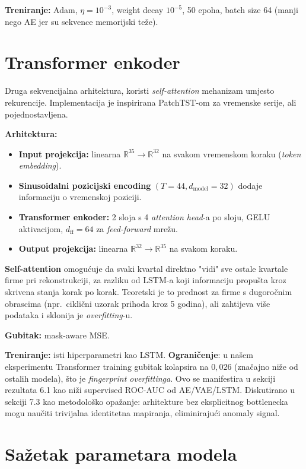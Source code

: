 \documentclass[diplomskirad,authoryear]{fer}
\begin{document}
\textbf{Treniranje:} Adam, $\eta = 10^{-3}$, weight decay $10^{-5}$, 50 epoha, batch size 64 (manji nego AE jer su sekvence memorijski teže).

\section{Transformer enkoder}

Druga sekvencijalna arhitektura, koristi \emph{self-attention} mehanizam \citep{vaswani2017} umjesto rekurencije. Implementacija je inspirirana PatchTST-om \citep{nie2023} za vremenske serije, ali pojednostavljena.

\textbf{Arhitektura:}
\begin{itemize}
 \item \textbf{Input projekcija:} linearna $\mathbb{R}^{35} \to \mathbb{R}^{32}$ na svakom vremenskom koraku (\emph{token embedding}).
 \item \textbf{Sinusoidalni pozicijski encoding} $(T=44, d_{\text{model}}=32)$ dodaje informaciju o vremenskoj poziciji.
 \item \textbf{Transformer enkoder:} 2 sloja s 4 \emph{attention head}-a po sloju, GELU aktivacijom, $d_{\text{ff}}=64$ za \emph{feed-forward} mrežu.
 \item \textbf{Output projekcija:} linearna $\mathbb{R}^{32} \to \mathbb{R}^{35}$ na svakom koraku.
\end{itemize}

\textbf{Self-attention} omogućuje da svaki kvartal direktno "vidi" sve ostale kvartale firme pri rekonstrukciji, za razliku od LSTM-a koji informaciju propušta kroz skrivena stanja korak po korak. Teoretski je to prednost za firme s dugoročnim obrascima (npr.\ ciklični uzorak prihoda kroz 5 godina), ali zahtijeva više podataka i sklonija je \emph{overfitting}-u.

\textbf{Gubitak:} mask-aware MSE.

\textbf{Treniranje:} isti hiperparametri kao LSTM. \textbf{Ograničenje}: u našem eksperimentu Transformer training gubitak kolapsira na $0{,}026$ (značajno niže od ostalih modela), što je \emph{fingerprint overfittinga}. Ovo se manifestira u sekciji rezultata 6.1 kao niži supervised ROC-AUC od AE/VAE/LSTM. Diskutirano u sekciji 7.3 kao metodološko opažanje: arhitekture bez eksplicitnog bottlenecka mogu naučiti trivijalna identitetna mapiranja, eliminirajući anomaly signal.

\section{Sažetak parametara modela}
\end{document}
